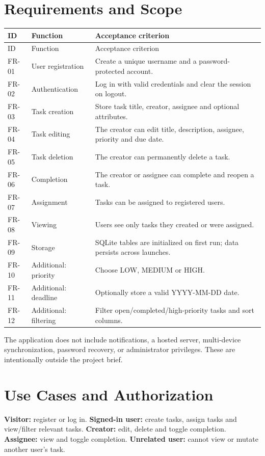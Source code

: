 \documentclass[11pt,a4paper]{article}
\begin{document}
\section{Requirements and Scope}
\small
\begin{longtable}{p{14mm}p{44mm}p{84mm}}
\toprule ID & Function & Acceptance criterion \\ \midrule\endfirsthead
\toprule ID & Function & Acceptance criterion \\ \midrule\endhead
FR-01 & User registration & Create a unique username and a password-protected account.\\
FR-02 & Authentication & Log in with valid credentials and clear the session on logout.\\
FR-03 & Task creation & Store task title, creator, assignee and optional attributes.\\
FR-04 & Task editing & The creator can edit title, description, assignee, priority and due date.\\
FR-05 & Task deletion & The creator can permanently delete a task.\\
FR-06 & Completion & The creator or assignee can complete and reopen a task.\\
FR-07 & Assignment & Tasks can be assigned to registered users.\\
FR-08 & Viewing & Users see only tasks they created or were assigned.\\
FR-09 & Storage & SQLite tables are initialized on first run; data persists across launches.\\
FR-10 & Additional: priority & Choose LOW, MEDIUM or HIGH.\\
FR-11 & Additional: deadline & Optionally store a valid YYYY-MM-DD date.\\
FR-12 & Additional: filtering & Filter open/completed/high-priority tasks and sort columns.\\
\bottomrule
\end{longtable}
\normalsize
The application does not include notifications, a hosted server, multi-device synchronization, password recovery, or administrator privileges. These are intentionally outside the project brief.

\section{Use Cases and Authorization}
\textbf{Visitor:} register or log in. \textbf{Signed-in user:} create tasks, assign tasks and view/filter relevant tasks. \textbf{Creator:} edit, delete and toggle completion. \textbf{Assignee:} view and toggle completion. \textbf{Unrelated user:} cannot view or mutate another user's task.
\end{document}
